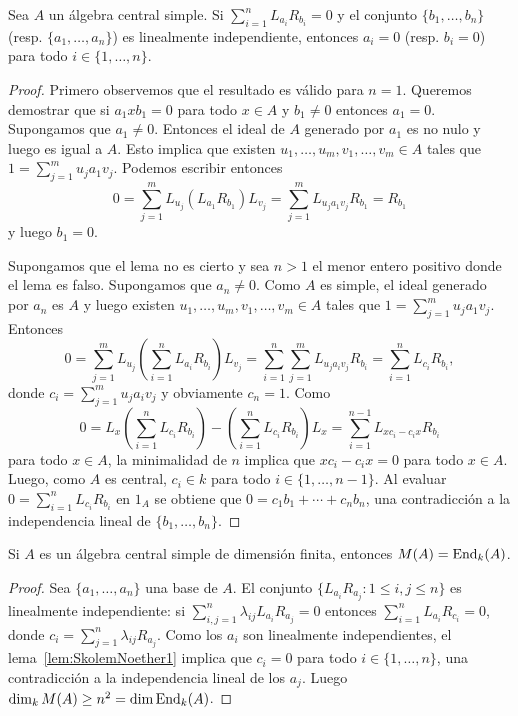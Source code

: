 \begin{lemma}
	\label{lem:SkolemNoether1}
	Sea $A$ un álgebra central simple. Si $\sum_{i=1}^n L_{a_i}R_{b_i}=0$ y el
	conjunto $\{b_1,\dots,b_n\}$ (resp. $\{a_1,\dots,a_n\}$) es linealmente
	independiente, entonces $a_i=0$ (resp. $b_i=0$) para todo
	$i\in\{1,\dots,n\}$.
\end{lemma}

\begin{proof}
	Primero observemos que el resultado es válido para $n=1$. Queremos
	demostrar que si $a_1xb_1=0$ para todo $x\in A$ y $b_1\ne0$ entonces
	$a_1=0$. Supongamos que $a_1\ne 0$. Entonces el ideal de $A$ generado por
	$a_1$ es no nulo y luego es igual a $A$. Esto implica que existen
	$u_1,\dots,u_m,v_1,\dots,v_m\in A$ tales que $1=\sum_{j=1}^m u_ja_1v_j$.
	Podemos escribir entonces 
	\[
		0=\sum_{j=1}^m L_{u_j}(L_{a_1}R_{b_1})L_{v_j}=\sum_{j=1}^m L_{u_ja_1v_j}R_{b_1}=R_{b_1}
	\]
	y luego $b_1=0$. 

	Supongamos que el lema no es cierto y sea $n>1$ el menor entero positivo
	donde el lema es falso. Supongamos que $a_n\ne 0$. Como $A$ es simple, el
	ideal generado por $a_n$ es $A$ y luego existen
	$u_1,\dots,u_m,v_1,\dots,v_m\in A$ tales que $1=\sum_{j=1}^m u_ja_1v_j$.
	Entonces
	\[
		0=\sum_{j=1}^m L_{u_j}\left(\sum_{i=1}^n L_{a_i}R_{b_i}\right)L_{v_j}=\sum_{i=1}^n\sum_{j=1}^m L_{u_ja_iv_j}R_{b_i}=\sum_{i=1}^n L_{c_i}R_{b_i},
	\]
	donde $c_i=\sum_{j=1}^m u_ja_iv_j$ y obviamente $c_n=1$. Como 
	\[
		0=L_x\left(\sum_{i=1}^n L_{c_i}R_{b_i}\right)-\left(\sum_{i=1}^n L_{c_i}R_{b_i}\right)L_x=\sum_{i=1}^{n-1}L_{xc_i-c_ix}R_{b_i}
	\]
	para todo $x\in A$, la minimalidad de $n$ implica que $xc_i-c_ix=0$ para
	todo $x\in A$. Luego, como $A$ es central, $c_i\in k$ para todo
	$i\in\{1,\dots,n-1\}$. Al evaluar $0=\sum_{i=1}^n L_{c_i}R_{b_i}$ en $1_A$
	se obtiene que $0=c_1b_1+\cdots+c_nb_n$, una contradicción a la
	independencia lineal de $\{b_1,\dots,b_n\}$. 
\end{proof}

\begin{lemma}
	\label{lem:SkolemNoether2}
	Si $A$ es un álgebra central simple de dimensión finita, entonces $M(A)=\operatorname{End}_k(A)$. 
\end{lemma}

\begin{proof}
	Sea $\{a_1,\dots,a_n\}$ una base de $A$. El conjunto
	$\{L_{a_i}R_{a_j}:1\leq i,j\leq n\}$ es linealmente independiente: si
	$\sum_{i,j=1}^n\lambda_{ij}L_{a_i}R_{a_j}=0$ entonces
	$\sum_{i=1}^nL_{a_i}R_{c_i}=0$, donde
	$c_i=\sum_{j=1}^n\lambda_{ij}R_{a_j}$. Como los $a_i$ son linealmente
	independientes, el lema~\ref{lem:SkolemNoether1} implica que $c_i=0$ para
	todo $i\in\{1,\dots,n\}$, una contradicción a la independencia lineal de los $a_j$.  
	Luego $\dim_kM(A)\geq n^2=\dim\operatorname{End}_k(A)$.
\end{proof}


